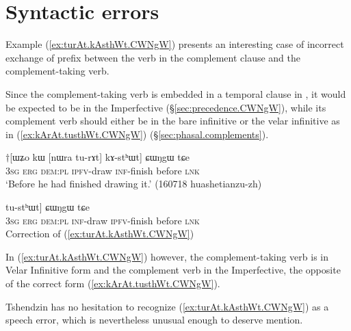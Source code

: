 \section{Syntactic errors} \label{sec:syntactic.errors}
Example (\ref{ex:turAt.kAsthWt.CWNgW}) presents an interesting case of incorrect exchange of prefix between the verb in the complement clause and the com\-ple\-ment-taking verb. 

Since the com\-ple\-ment-taking verb  is embedded in a temporal clause in , it would be expected to be in the Imperfective (§\ref{sec:precedence.CWNgW}), while its complement verb should either be in the bare infinitive or the velar infinitive as in (\ref{ex:kArAt.tusthWt.CWNgW}) (§\ref{sec:phasal.complements}).

\begin{exe}
\ex \label{ex:turAt.kAsthWt.CWNgW}
\gll $\dagger$[ɯʑo kɯ [nɯra tu-rɤt] kɤ-stʰɯt] ɕɯŋgɯ tɕe \\
\textsc{3sg} \textsc{erg} \textsc{dem}:\textsc{pl} \textsc{ipfv}-draw \textsc{inf}-finish before \textsc{lnk} \\
\glt `Before he had finished drawing it.' (160718 huashetianzu-zh)
\end{exe} 

\begin{exe}
\ex \label{ex:kArAt.tusthWt.CWNgW}
\gll [ɯʑo kɯ [nɯra kɤ-rɤt] tu-stʰɯt] ɕɯŋgɯ tɕe \\
\textsc{3sg} \textsc{erg} \textsc{dem}:\textsc{pl} \textsc{inf}-draw \textsc{ipfv}-finish before \textsc{lnk} \\
\glt Correction of (\ref{ex:turAt.kAsthWt.CWNgW})
\end{exe}   

In (\ref{ex:turAt.kAsthWt.CWNgW}) however, the com\-ple\-ment-taking verb is in Velar Infinitive form and the complement verb in the Imperfective, the opposite of the correct form (\ref{ex:kArAt.tusthWt.CWNgW}).

Tshendzin has no hesitation to recognize (\ref{ex:turAt.kAsthWt.CWNgW}) as a speech error, which is nevertheless unusual enough to deserve mention.

